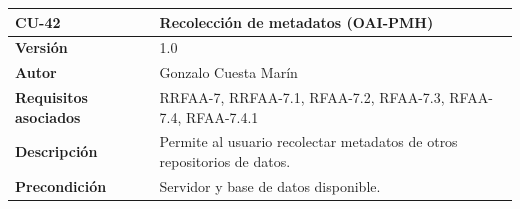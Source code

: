 \documentclass[
]{article}
\begin{document}
\begin{longtable}[]{@{}ll@{}}
\toprule
\begin{minipage}[b]{0.19\columnwidth}\raggedright
\textbf{CU-42}\strut
\end{minipage} & \begin{minipage}[b]{0.75\columnwidth}\raggedright
\textbf{Recolección de metadatos (OAI-PMH)}\strut
\end{minipage}\tabularnewline
\midrule
\endhead
\begin{minipage}[t]{0.19\columnwidth}\raggedright
\textbf{Versión}\strut
\end{minipage} & \begin{minipage}[t]{0.75\columnwidth}\raggedright
1.0\strut
\end{minipage}\tabularnewline
\begin{minipage}[t]{0.19\columnwidth}\raggedright
\textbf{Autor}\strut
\end{minipage} & \begin{minipage}[t]{0.75\columnwidth}\raggedright
Gonzalo Cuesta Marín\strut
\end{minipage}\tabularnewline
\begin{minipage}[t]{0.19\columnwidth}\raggedright
\textbf{Requisitos asociados}\strut
\end{minipage} & \begin{minipage}[t]{0.75\columnwidth}\raggedright
RRFAA-7, RRFAA-7.1, RFAA-7.2, RFAA-7.3, RFAA-7.4, RFAA-7.4.1\strut
\end{minipage}\tabularnewline
\begin{minipage}[t]{0.19\columnwidth}\raggedright
\textbf{Descripción}\strut
\end{minipage} & \begin{minipage}[t]{0.75\columnwidth}\raggedright
Permite al usuario recolectar metadatos de otros repositorios de
datos.\strut
\end{minipage}\tabularnewline
\begin{minipage}[t]{0.19\columnwidth}\raggedright
\textbf{Precondición}\strut
\end{minipage} & \begin{minipage}[t]{0.75\columnwidth}\raggedright
Servidor y base de datos disponible.


\end{minipage}
\end{longtable}
\end{document}
